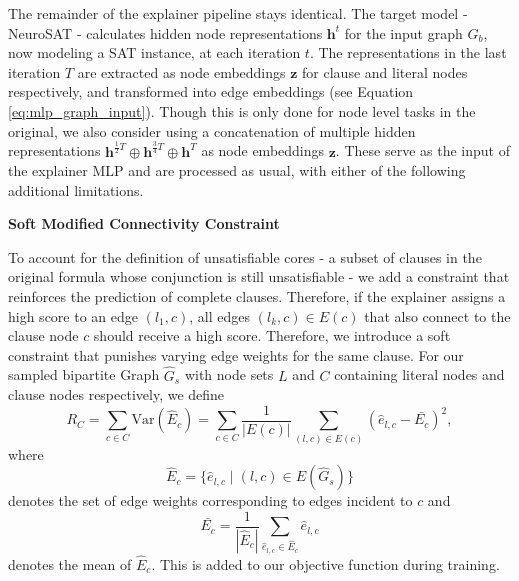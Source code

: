 The remainder of the explainer pipeline stays identical. The target model - NeuroSAT - calculates hidden node representations $\mathbf{h}^t$ for the input graph $G_b$, now modeling a SAT instance, at each iteration $t$. The representations in the last iteration $T$ are extracted as node embeddings $\mathbf{z}$ for clause and literal nodes respectively, and transformed into edge embeddings (see Equation \ref{eq:mlp_graph_input}). Though this is only done for node level tasks in the original, we also consider using a concatenation of multiple hidden representations $\mathbf{h}^{\frac{1}{2}T} \oplus \mathbf{h}^{\frac{3}{4}T} \oplus \mathbf{h}^T$ as node embeddings $\mathbf{z}$. These serve as the input of the explainer MLP and are processed as usual, with either of the following additional limitations. \bigskip


\textbf{Soft Modified Connectivity Constraint}\par
To account for the definition of unsatisfiable cores - a subset of clauses in the original formula whose conjunction is still unsatisfiable - we add a constraint that reinforces the prediction of complete clauses. Therefore, if the explainer assigns a high score to an edge $(l_1,c)$, all edges $(l_k,c) \in E(c)$ that also connect to the clause node $c$ should receive a high score. Therefore, we introduce a soft constraint that punishes varying edge weights for the same clause. For our sampled bipartite Graph $\hat{G}_s$ with node sets $L$ and $C$ containing literal nodes and clause nodes respectively, we define
\begin{equation}
    \label{eq:soft_restraint}
    R_C = \sum_{c \in C}  \text{Var}(\hat{E}_c) = \sum_{c \in C} \frac{1}{|E(c)|} \sum_{(l,c) \in E(c)} (\hat{e}_{l,c} - \bar{E_c})^2,
\end{equation}
where
\begin{equation}
    \hat{E}_c = \{\hat{e}_{l,c} \mid (l,c)\in E(\hat{G}_s)\}
\end{equation}
denotes the set of edge weights corresponding to edges incident to $c$ and 
\begin{equation}
    \bar{E_c} = \frac{1}{|\hat{E}_c|}\sum_{\hat{e}_{l,c} \in \hat{E}_c} \hat{e}_{l,c}
\end{equation}
denotes the mean of $\hat{E}_c$. This is added to our objective function during training. \bigskip


